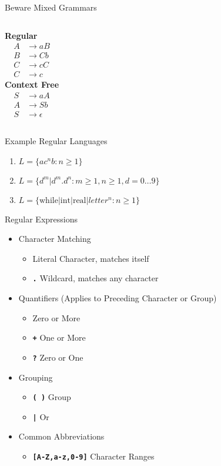 \documentclass[handout]{beamer}
\begin{document}
\begin{frame}{Beware Mixed Grammars}
\begin{columns}
{\bf Regular}
\begin{align*}
    A & \rightarrow aB \\
    B & \rightarrow Cb \\
    C & \rightarrow cC \\
    C & \rightarrow c
\end{align*}
{\bf Context Free}
\begin{align*}
    S & \rightarrow aA \\
    A & \rightarrow Sb \\
    S & \rightarrow \epsilon
\end{align*}
\end{columns}
\end{frame}


\begin{frame}{Example Regular Languages}
\begin{enumerate}
    \item $L = \{ac^nb : n \geq 1\}$
    \item $L = \{d^m | d^m.d^n : m \geq 1, n\geq1, d=0\ldots 9\}$
    \item $L = \{\mathrm{while} | \mathrm{int} | \mathrm{real} | letter^n : n\geq 1\}$ 
\end{enumerate}
\end{frame}


\begin{frame}{Regular Expressions}
\begin{itemize}
    \item Character Matching
    \begin{itemize}
        \item Literal Character, matches itself
        \item \texttt{\bf .} Wildcard, matches any character
    \end{itemize}
    \item Quantifiers (Applies to Preceding Character or Group) 
    \begin{itemize}
        \item \texttt{\bf *} Zero or More
        \item \texttt{\bf +} One or More
        \item \texttt{\bf ?} Zero or One
    \end{itemize}
    \item Grouping
    \begin{itemize}
        \item \texttt{\bf ( )} Group
        \item \texttt{\bf |} Or
    \end{itemize}
    \item Common Abbreviations
    \begin{itemize}
        \item \texttt{\bf [A-Z,a-z,0-9]} Character Ranges
    \end{itemize}
\end{itemize}

\end{frame}
\end{document}
